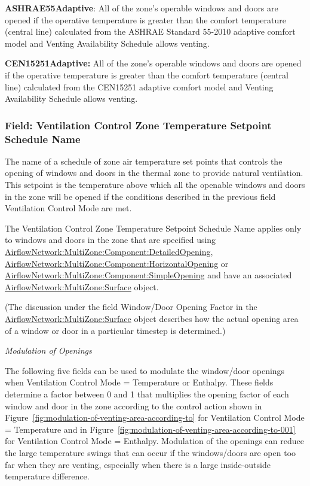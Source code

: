 \textbf{ASHRAE55Adaptive}: All of the zone's operable windows and doors are opened if the operative temperature is greater than the comfort temperature (central line) calculated from the ASHRAE Standard 55-2010 adaptive comfort model and Venting Availability Schedule allows venting.

\textbf{CEN15251Adaptive:} All of the zone's operable windows and doors are opened if the operative temperature is greater than the comfort temperature (central line) calculated from the CEN15251 adaptive comfort model and Venting Availability Schedule allows venting.

\subsubsection{Field: Ventilation Control Zone Temperature Setpoint Schedule Name}\label{field-ventilation-control-zone-temperature-setpoint-schedule-name}

The name of a schedule of zone air temperature set points that controls the opening of windows and doors in the thermal zone to provide natural ventilation. This setpoint is the temperature above which all the openable windows and doors in the zone will be opened if the conditions described in the previous field Ventilation Control Mode are met.

The Ventilation Control Zone Temperature Setpoint Schedule Name applies only to windows and doors in the zone that are specified using \hyperref[airflownetworkmultizonecomponentdetailedopening]{AirflowNetwork:MultiZone:Component:DetailedOpening}, \hyperref[airflownetworkmultizonecomponenthorizontalopening]{AirflowNetwork:MultiZone:Component:HorizontalOpening} or \hyperref[airflownetworkmultizonecomponentsimpleopening]{AirflowNetwork:MultiZone:Component:SimpleOpening} and have an associated \hyperref[airflownetworkmultizonesurface]{AirflowNetwork:MultiZone:Surface} object.

(The discussion under the field Window/Door Opening Factor in the \hyperref[airflownetworkmultizonesurface]{AirflowNetwork:MultiZone:Surface} object describes how the actual opening area of a window or door in a particular timestep is determined.)

\emph{Modulation of Openings}

The following five fields can be used to modulate the window/door openings when Ventilation Control Mode = Temperature or Enthalpy. These fields determine a factor between 0 and 1 that multiplies the opening factor of each window and door in the zone according to the control action shown in Figure~\ref{fig:modulation-of-venting-area-according-to} for Ventilation Control Mode = Temperature and in Figure~\ref{fig:modulation-of-venting-area-according-to-001} for Ventilation Control Mode = Enthalpy. Modulation of the openings can reduce the large temperature swings that can occur if the windows/doors are open too far when they are venting, especially when there is a large inside-outside temperature difference.

